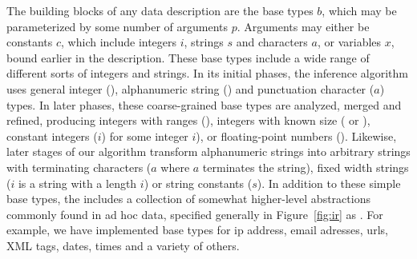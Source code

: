 The building blocks of any \ir{} data description are the base types $b$,
which may be parameterized by some number of arguments $p$.  Arguments
may either be constants $c$, which include integers $i$, strings
$s$ and characters $a$, or variables $x$, bound earlier in the description.
These base types include a wide range of different sorts of
integers and strings.  In its initial phases, the inference algorithm
uses general integer (), alphanumeric string ()
and punctuation character ($a$\cd{)}) types.  In later phases,
these coarse-grained base types are analyzed, merged and refined, producing
integers with ranges (),
integers with known size ( or ), constant integers
($i$\cd{)}) for some integer $i$), or floating-point
numbers ().  Likewise, later stages of our algorithm transform
alphanumeric strings into arbitrary strings with terminating characters
($a$\cd{)} where $a$ terminates the string), fixed width
strings ($i$\cd{)} is a string with a length $i$) 
or string constants  ($s$\cd{)}).  
In addition to these simple base types, the \ir{} includes a collection of
somewhat higher-level abstractions commonly found in ad hoc data, specified 
generally in Figure~\ref{fig:ir} as .  For example, we 
have implemented
base types for ip address, email adresses, urls, XML tags, dates, times and 
a variety of others.


